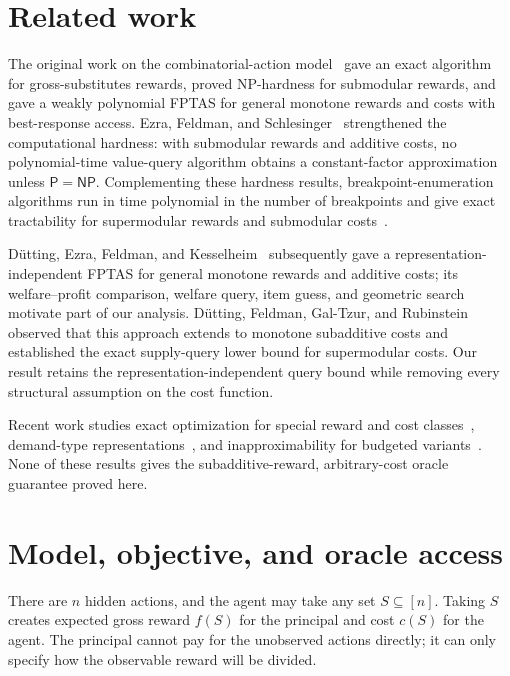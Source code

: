 \documentclass[11pt]{article}
\begin{document}
\section{Related work}\label{sec:related}

The original work on the combinatorial-action model~\cite{DEFK21} gave an
exact algorithm for gross-substitutes rewards, proved NP-hardness for
submodular rewards, and gave a weakly polynomial FPTAS for general monotone
rewards and costs with best-response access.  Ezra, Feldman, and
Schlesinger~\cite{EFS24} strengthened the computational hardness: with
submodular rewards and additive costs, no polynomial-time value-query
algorithm obtains a constant-factor approximation unless $\mathsf{P} =
\mathsf{NP}$.  Complementing these hardness results, breakpoint-enumeration
algorithms run in time polynomial in the number of breakpoints and give
exact tractability for supermodular rewards and submodular
costs~\cite{DDPP24,DFG24}.

D\"utting, Ezra, Feldman, and Kesselheim~\cite{DEFK25} subsequently gave a
representation-independent FPTAS for general monotone rewards and additive
costs; its welfare--profit comparison, welfare query, item guess, and
geometric search motivate part of our analysis.  D\"utting, Feldman,
Gal-Tzur, and Rubinstein~\cite{DFGR26} observed that this approach extends to
monotone subadditive costs and established the exact supply-query lower
bound for supermodular costs.  Our result retains the
representation-independent query bound while removing every structural
assumption on the cost function.

Recent work studies exact optimization for special reward and cost
classes~\cite{FY25}, demand-type representations~\cite{BaldwinEtAl26}, and
inapproximability for budgeted variants~\cite{FeldmanEtAl26}.  None of these
results gives the subadditive-reward, arbitrary-cost oracle guarantee proved
here.

\section{Model, objective, and oracle access}\label{sec:model}

There are $n$ hidden actions, and the agent may take any set $S\subseteq[n]$.
Taking $S$ creates expected gross reward $f(S)$ for the principal and cost
$c(S)$ for the agent.  The principal cannot pay for the unobserved actions
directly; it can only specify how the observable reward will be divided.
\end{document}
